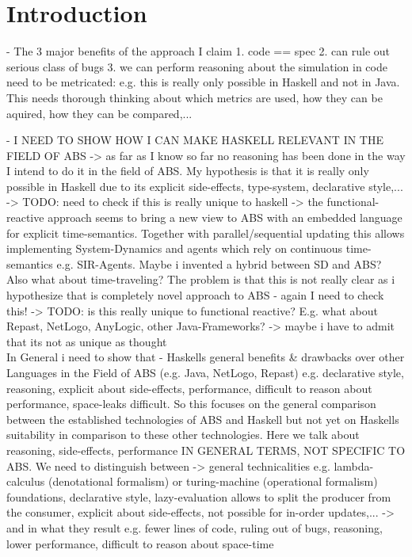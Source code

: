 \section{Introduction}

- The 3 major benefits of the approach I claim
	1. code == spec
	2. can rule out serious class of bugs
	3. we can perform reasoning about the simulation in code
	need to be metricated: e.g. this is really only possible in Haskell and not in Java. This needs thorough thinking about which metrics are used, how they can be aquired, how they can be compared,...
	
- I NEED TO SHOW HOW I CAN MAKE HASKELL RELEVANT IN THE FIELD OF ABS
	-> as far as I know so far no reasoning has been done in the way I intend to do it in the field of ABS. My hypothesis is that it is really only possible in Haskell due to its explicit side-effects, type-system, declarative style,... 
		-> TODO: need to check if this is really unique to haskell
	-> the functional-reactive approach seems to bring a new view to ABS with an embedded language for explicit time-semantics. Together with parallel/sequential updating this allows implementing System-Dynamics and agents which rely on continuous time-semantics e.g. SIR-Agents. Maybe i invented a hybrid between SD and ABS? Also what about time-traveling? The problem is that this is not really clear as i hypothesize that is completely novel approach to ABS - again I need to check this!
		-> TODO: is this really unique to functional reactive? E.g. what about Repast, NetLogo, AnyLogic, other Java-Frameworks? 
	-> maybe i have to admit that its not as unique as thought\\
	
In General i need to show that
- Haskells general benefits \& drawbacks over other Languages in the Field of ABS (e.g. Java, NetLogo, Repast) e.g. declarative style, reasoning, explicit about side-effects, performance, difficult to reason about performance, space-leaks difficult. So this focuses on the general comparison between the established technologies of ABS and Haskell but not yet on Haskells suitability in comparison to these other technologies. Here we talk about reasoning, side-effects, performance IN GENERAL TERMS, NOT SPECIFIC TO ABS. We need to distinguish between 
	-> general technicalities e.g. lambda-calculus (denotational formalism) or turing-machine (operational formalism) foundations, declarative style, lazy-evaluation allows to split the producer from the consumer, explicit about side-effects, not possible for in-order updates,...
	-> and in what they result e.g. fewer lines of code, ruling out of bugs, reasoning, lower performance, difficult to reason about space-time 
	
